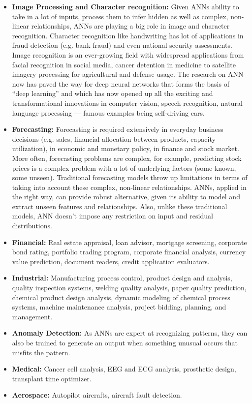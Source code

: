 \documentclass[a4paper, 12pt]{article}
\begin{document}
\begin{itemize}
	
	\item \textbf{  Image Processing and Character recognition:}	Given ANNs ability to take in a lot of inputs, process them to infer hidden as well as complex, non-linear relationships, ANNs are playing a big role in image and character recognition. Character recognition like handwriting has lot of applications in fraud detection (e.g. bank fraud) and even national security assessments. Image recognition is an ever-growing field with widespread applications from facial recognition in social media, cancer detention in medicine to satellite imagery processing for agricultural and defense usage. The research on ANN now has paved the way for deep neural networks that forms the basis of “deep learning” and which has now opened up all the exciting and transformational innovations in computer vision, speech recognition, natural language processing — famous examples being self-driving cars.
	
	\item \textbf{ Forecasting:}	Forecasting is required extensively in everyday business decisions (e.g. sales, financial allocation between products, capacity utilization), in economic and monetary policy, in finance and stock market. More often, forecasting problems are complex, for example, predicting stock prices is a complex problem with a lot of underlying factors (some known, some unseen). Traditional forecasting models throw up limitations in terms of taking into account these complex, non-linear relationships. ANNs, applied in the right way, can provide robust alternative, given its ability to model and extract unseen features and relationships. Also, unlike these traditional models, ANN doesn’t impose any restriction on input and residual distributions.
	
	\item \textbf{ Financial:}	  Real estate appraisal, loan advisor, mortgage screening, corporate bond rating, portfolio trading program, corporate financial analysis, currency value prediction, document readers, credit application evaluators.
	\item \textbf{ Industrial:}	  Manufacturing process control, product design and analysis, quality inspection systems, welding quality analysis, paper quality prediction, chemical product design analysis, dynamic modeling of chemical process systems, machine maintenance analysis, project bidding, planning, and management.
	\item \textbf{ Anomaly Detection:}	  As ANNs are expert at recognizing patterns, they can also be trained to generate an output when something unusual occurs that misfits the pattern.
	\item \textbf{ Medical:}  Cancer cell analysis, EEG and ECG analysis, prosthetic design, transplant time optimizer.
	\item \textbf{ Aerospace:}	Autopilot aircrafts, aircraft fault detection.
	
\end{itemize}
\end{document}
